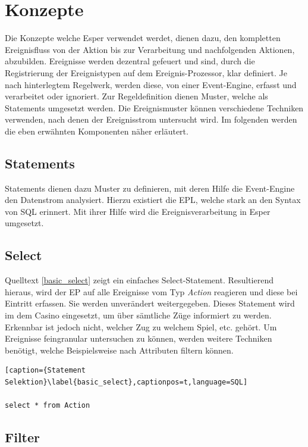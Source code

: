 \chapter{Konzepte}
Die Konzepte welche Esper verwendet werdet, dienen dazu, den kompletten Ereignisfluss von der Aktion bis zur Verarbeitung und nachfolgenden Aktionen, abzubilden.
Ereignisse werden dezentral gefeuert und sind, durch die Registrierung der Ereignistypen auf dem Ereignis-Prozessor, klar definiert. Je nach hinterlegtem Regelwerk, werden diese, von einer Event-Engine, erfasst und verarbeitet oder ignoriert. Zur Regeldefinition dienen Muster, welche als Statements umgesetzt werden. Die Ereignismuster können verschiedene Techniken verwenden, nach denen der Ereignisstrom untersucht wird. Im folgenden werden die eben erwähnten Komponenten näher erläutert.

\section{Statements}

Statements dienen dazu Muster zu definieren, mit deren Hilfe die Event-Engine den Datenstrom analysiert. Hierzu existiert die \acf{EPL}, welche stark an den Syntax von SQL erinnert. Mit ihrer Hilfe wird die Ereignisverarbeitung in Esper umgesetzt.

\section{Select}

Quelltext \ref{basic_select} zeigt ein einfaches Select-Statement. Resultierend hieraus, wird der \acf{EP} auf alle Ereignisse vom Typ \textit{Action} reagieren und diese bei Eintritt erfassen. Sie werden unverändert weitergegeben. Dieses Statement wird im dem Casino eingesetzt, um über sämtliche Züge informiert zu werden. Erkennbar ist jedoch nicht, welcher Zug zu welchem Spiel, etc. gehört. Um Ereignisse feingranular untersuchen zu können, werden weitere Techniken benötigt, welche Beispielsweise nach Attributen filtern können.

\begin{lstlisting}[caption={Statement Selektion}\label{basic_select},captionpos=t,language=SQL]

select * from Action

\end{lstlisting}

\section{Filter}

